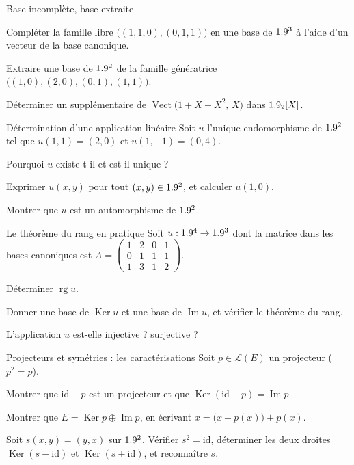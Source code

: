 \begin{exercice}[2]{Base incomplète, base extraite}
\begin{questions}
  \item Compléter la famille libre $\bigl((1,1,0),(0,1,1)\bigr)$ en une
    base de $1.9^{3}$ à l'aide d'un vecteur de la base canonique.
  \item Extraire une base de $1.9^{2}$ de la famille génératrice
    $\bigl((1,0),(2,0),(0,1),(1,1)\bigr)$.
  \item Déterminer un supplémentaire de
    $\operatorname{Vect}\bigl(1+X+X^{2},\,X\bigr)$ dans $1.9_2[X]$.
\end{questions}
\end{exercice}

\begin{exercice}[2]{Détermination d'une application linéaire}
Soit $u$ l'unique endomorphisme de $1.9^{2}$ tel que $u(1,1)=(2,0)$ et
$u(1,-1)=(0,4)$.
\begin{questions}
  \item Pourquoi $u$ existe-t-il et est-il unique ?
  \item Exprimer $u(x,y)$ pour tout $(x,y)\in1.9^{2}$, et calculer $u(1,0)$.
  \item Montrer que $u$ est un automorphisme de $1.9^{2}$.
\end{questions}
\end{exercice}

\begin{exercice}[2]{Le théorème du rang en pratique}
Soit $u:1.9^{4}\to1.9^{3}$ dont la matrice dans les bases canoniques est
$A=\begin{pmatrix}1&2&0&1\\0&1&1&1\\1&3&1&2\end{pmatrix}$.
\begin{questions}
  \item Déterminer $\operatorname{rg}u$.
  \item Donner une base de $\operatorname{Ker}u$ et une base de
    $\operatorname{Im}u$, et vérifier le théorème du rang.
  \item L'application $u$ est-elle injective ? surjective ?
\end{questions}
\end{exercice}

\begin{exercice}[2]{Projecteurs et symétries : les caractérisations}
Soit $p\in\mathcal{L}(E)$ un projecteur ($p^{2}=p$).
\begin{questions}
  \item Montrer que $\mathrm{id}-p$ est un projecteur et que
    $\operatorname{Ker}(\mathrm{id}-p)=\operatorname{Im}p$.
  \item Montrer que $E=\operatorname{Ker}p\oplus\operatorname{Im}p$,
    en écrivant $x=\bigl(x-p(x)\bigr)+p(x)$.
  \item Soit $s(x,y)=(y,x)$ sur $1.9^{2}$. Vérifier $s^{2}=\mathrm{id}$,
    déterminer les deux droites $\operatorname{Ker}(s-\mathrm{id})$ et
    $\operatorname{Ker}(s+\mathrm{id})$, et reconnaître $s$.
\end{questions}
\end{exercice}

